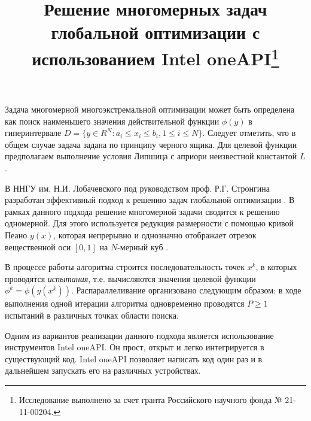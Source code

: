 \documentclass[11pt, oneside, a4paper]{article}
\begin{document}

\title{Решение многомерных задач глобальной оптимизации с использованием Intel oneAPI\footnote{Исследование выполнено за счет гранта Российского научного фонда № 21-11-00204.}}



Задача многомерной многоэкстремальной оптимизации может быть определена как поиск наименьшего значения действительной функции \(\phi(y)\)  в гиперинтервале \(D=\{y\in R^N:a_i\leqslant x_i\leqslant{b_i}, 1\leqslant{i}\leqslant{N}\}\). 
Следует отметить, что в общем случае задача задана по принципу черного ящика. Для целевой функции предполагаем выполнение условия Липшица с априори неизвестной константой \(L\).

В ННГУ им. Н.И. Лобачевского под руководством проф. Р.Г. Стронгина разработан эффективный подход к решению задач глобальной оптимизации \cite{Strongin2013}. В рамках данного подхода решение многомерной задачи сводится к решению одномерной. Для этого используется редукция размерности с помощью кривой Пеано \(y(x)\), которая непрерывно и однозначно отображает отрезок вещественной оси \([0,1]\) на \(N\)-мерный куб \cite{Sergeyev2013}.


В процессе работы алгоритма строится последовательность точек \(x^k\), в которых проводятся \textit{испытания}, т.е. вычисляются значения целевой функции \(\phi^k=\phi(y(x^k))\). Распараллеливание организовано следующим образом: в ходе выполнения одной итерации алгоритма одновременно проводятся \(P \geq 1\) испытаний в различных точках области поиска.

Одним из вариантов реализации данного подхода является использование инструментов Intel oneAPI. Он прост, открыт и легко интегрируется в существующий код. Intel oneAPI позволяет написать код один раз и в дальнейшем запускать его на различных устройствах. 
\end{document}
